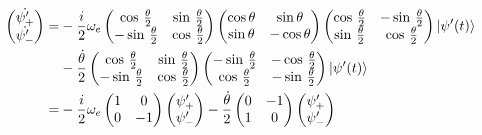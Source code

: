 \begin{align}
    \left(\begin{matrix}
    \dot{\psi'_{+}}\\
    \dot{\psi'_{-}}
    \end{matrix}\right)= & -\frac{i}{2}\omega_{e}\left(\begin{matrix}
    \cos\,\frac{\theta}{2} & \sin\,\frac{\theta}{2}\\
    -\sin\,\frac{\theta}{2} & \cos\,\frac{\theta}{2}
    \end{matrix}\right)\left(\begin{matrix}
    \cos\theta & \sin\theta\\
    \sin\theta & -\cos\theta
    \end{matrix}\right)\left(\begin{matrix}
    \cos\,\frac{\theta}{2} & -\sin\,\frac{\theta}{2}\\
    \sin\,\frac{\theta}{2} & \cos\,\frac{\theta}{2}
    \end{matrix}\right)\Ket{\psi'(t)} \nonumber \\
     & -\frac{\dot{\theta}}{2}\left(\begin{matrix}
    \cos\,\frac{\theta}{2} & \sin\,\frac{\theta}{2}\\
    -\sin\,\frac{\theta}{2} & \cos\,\frac{\theta}{2}
    \end{matrix}\right)\left(\begin{matrix}
    -\sin\,\frac{\theta}{2} & -\cos\,\frac{\theta}{2}\\
    \cos\,\frac{\theta}{2} & -\sin\,\frac{\theta}{2}
    \end{matrix}\right)\Ket{\psi'(t)} \nonumber \\
    = & -\frac{i}{2}\omega_{e}\left(\begin{matrix}
    1 & 0\\
    0 & -1
    \end{matrix}\right)\left(\begin{matrix}
    \psi'_{+}\\
    \psi'_{-}
    \end{matrix}\right)-\frac{\dot{\theta}}{2}\left(\begin{matrix}
    0 & -1\\
    1 & 0
    \end{matrix}\right)\left(\begin{matrix}
    \psi'_{+}\\
    \psi'_{-}
    \end{matrix}\right) \label{eq:adiab_derivation_6}
\end{align}
